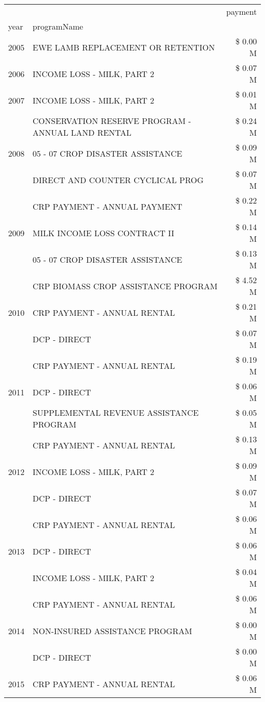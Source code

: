 \begin{tabular}{llr}
\toprule
 &  & payment \\
year & programName &  \\
\midrule
2005 & EWE LAMB REPLACEMENT OR RETENTION & \$ 0.00 M \\
\cline{1-3}
2006 & INCOME LOSS - MILK, PART 2 & \$ 0.07 M \\
\cline{1-3}
2007 & INCOME LOSS - MILK, PART 2 & \$ 0.01 M \\
\cline{1-3}
\multirow[t]{3}{*}{2008} & CONSERVATION RESERVE PROGRAM - ANNUAL LAND RENTAL & \$ 0.24 M \\
 & 05 - 07 CROP DISASTER ASSISTANCE & \$ 0.09 M \\
 & DIRECT AND COUNTER CYCLICAL PROG & \$ 0.07 M \\
\cline{1-3}
\multirow[t]{3}{*}{2009} & CRP PAYMENT - ANNUAL PAYMENT & \$ 0.22 M \\
 & MILK INCOME LOSS CONTRACT II & \$ 0.14 M \\
 & 05 - 07 CROP DISASTER ASSISTANCE & \$ 0.13 M \\
\cline{1-3}
\multirow[t]{3}{*}{2010} & CRP BIOMASS CROP ASSISTANCE PROGRAM & \$ 4.52 M \\
 & CRP PAYMENT - ANNUAL RENTAL & \$ 0.21 M \\
 & DCP - DIRECT & \$ 0.07 M \\
\cline{1-3}
\multirow[t]{3}{*}{2011} & CRP PAYMENT - ANNUAL RENTAL & \$ 0.19 M \\
 & DCP - DIRECT & \$ 0.06 M \\
 & SUPPLEMENTAL REVENUE ASSISTANCE PROGRAM & \$ 0.05 M \\
\cline{1-3}
\multirow[t]{3}{*}{2012} & CRP PAYMENT - ANNUAL RENTAL & \$ 0.13 M \\
 & INCOME LOSS - MILK, PART 2 & \$ 0.09 M \\
 & DCP - DIRECT & \$ 0.07 M \\
\cline{1-3}
\multirow[t]{3}{*}{2013} & CRP PAYMENT - ANNUAL RENTAL & \$ 0.06 M \\
 & DCP - DIRECT & \$ 0.06 M \\
 & INCOME LOSS - MILK, PART 2 & \$ 0.04 M \\
\cline{1-3}
\multirow[t]{3}{*}{2014} & CRP PAYMENT - ANNUAL RENTAL & \$ 0.06 M \\
 & NON-INSURED ASSISTANCE PROGRAM & \$ 0.00 M \\
 & DCP - DIRECT & \$ 0.00 M \\
\cline{1-3}
\multirow[t]{2}{*}{2015} & CRP PAYMENT - ANNUAL RENTAL & \$ 0.06 M \\

\end{tabular}
